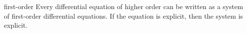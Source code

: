 \begin{Lemma}{first-order}
  Every differential equation of higher order can be written as a
  system of first-order differential equations. If the equation is
  explicit, then the system is explicit.
\end{Lemma}
